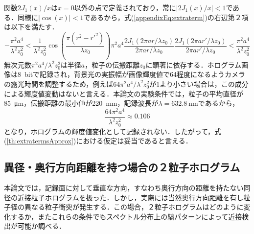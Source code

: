 関数$2J_1(x)/x$は$x=0$以外の点で定義されており，常に$|2J_1(x)/x| < 1$である．同様に$|\cos(x)|<1$であるから，式(\ref{appendixEq:extraterm})の右辺第２項は以下を満たす．
\begin{equation}
    -\frac{\pi^2 a^4}{\lambda^2 z_0^2} < \frac{1}{\lambda^2 z_0^2} \cos{\left( \frac{\pi \left( r^2-r'^2 \right)}{\lambda z_0} \right) \pi^2 a^4  \frac{2J_1(2\pi a r/ \lambda z_0)}{2\pi a r/ \lambda z_0} \frac{2J_1(2\pi a r'/ \lambda z_0)}{2\pi a r'/ \lambda z_0}} < \frac{\pi^2 a^4}{\lambda^2 z_0^2}
\end{equation}
無次元数$\pi^2 a^4 / \lambda^2 z_0^2$は半径$a$，粒子の伝搬距離$z_0$に顕著に依存する．ホログラム画像は\SI{8}{bit}で記録され，背景光の実振幅が画像輝度値で64程度になるようカメラの露光時間を調整するため，例えば$64\pi^2 a^4 / \lambda^2 z_0^2$が1より小さい場合は，この成分による輝度値変動はないと言える．本論文の実験条件では，粒子の平均直径が\SI{85}{\um}，伝搬距離の最小値が\SI{220}{\mm}，記録波長が$\lambda = \SI{632.8}{\nm}$であるから，
\begin{equation}
    \frac{64\pi^2 a^4}{\lambda^2 z_0^2} \approx 0.106
\end{equation}
となり，ホログラムの輝度値変化として記録されない．したがって，式(\ref{th:extratermsApprox})における仮定は妥当であると言える．

\subsection{異径・奥行方向距離を持つ場合の２粒子ホログラム}
\label{sec:appendix_deviation}
本論文では，記録面に対して垂直な方向，すなわち奥行方向の距離を持たない同径の近接粒子ホログラムを扱った．しかし，実際には当然奥行方向距離を有し粒子径の異なる粒子衝突が発生する．この場合，２粒子ホログラムはどのように変化するか，またこれらの条件でもスペクトル分布上の縞パターンによって近接検出が可能か調べる．

